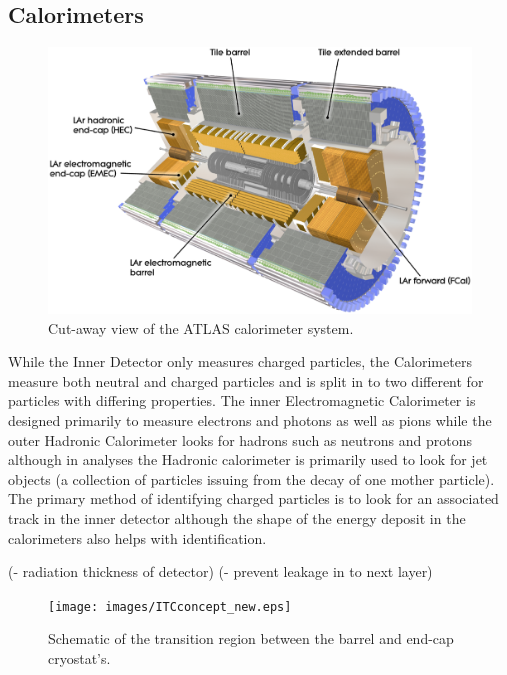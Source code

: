 	\subsection{Calorimeters}

		\begin{figure}[h]
			\begin{center}
				\includegraphics[scale=0.35]{images/Calorimeter_d3.eps}
			\end{center}
			\caption{Cut-away view of the ATLAS calorimeter system.}
			\label{fig:ATLAS_calo}
		\end{figure}

		While the Inner Detector only measures charged particles, the Calorimeters measure both neutral and charged particles and is split in to two different for particles with differing properties. The inner Electromagnetic Calorimeter is designed primarily to measure electrons and photons as well as pions while the outer Hadronic Calorimeter looks for hadrons such as neutrons and protons although in analyses the Hadronic calorimeter is primarily used to look for jet objects (a collection of particles issuing from the decay of one mother particle). The primary method of identifying charged particles is to look for an associated track in the inner detector although the shape of the energy deposit in the calorimeters also helps with identification.

		(- radiation thickness of detector)
		(- prevent leakage in to next layer)


		\begin{figure}[h]
			\begin{center}
				\texttt{[image: images/ITCconcept\_new.eps]}
			\end{center}
			\caption{Schematic of the transition region between the barrel and end-cap cryostat's.}
			\label{fig:ATLAS_calo_crack}
		\end{figure}


